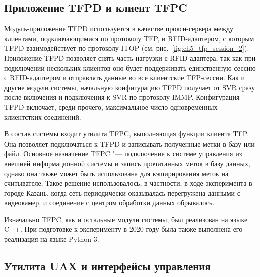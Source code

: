 \subsection{Приложение TFPD и клиент TFPC}\label{sec:ch5_components_tfpd_tfpc}

Модуль-приложение TFPD используется в качестве прокси-сервера между клиентами, подключающимися по протоколу TFP, и RFID-адаптером, с которым TFPD взаимодействует по протоколу ITOP (см. рис.~\ref{fig:ch5_tfp_session_2}). Приложение TFPD позволяет снять часть нагрузки с RFID-адаптера, так как при подключении нескольких клиентов оно будет поддерживать единственную сессию с RFID-адаптером и отправлять данные во все клиентские TFP-сессии. Как и другие модули системы, начальную конфигурацию TFPD получает от SVR сразу после включения и подключения к SVR по протоколу IMMP. Конфигурация TFPD включает, среди прочего, максимальное число одновременных клиентстких соединений.

В состав системы входит утилита TFPC, выполняющая функции клиента TFP. Она позволяет подключаться к TFPD и записывать полученные метки в базу или файл. Основное назначение TFPC "--- подключение к системе управления из внешней информационной системы и запись прочитанных меток в базу данных, однако она также может быть использована для кэширирования меток на считывателе. Такое решение использовалось, в частности, в ходе эксперимента в городе Казань, когда сеть периодически оказывалась перегружена данными с видеокамер, и соединение с центром обработки данных обрывалось.

Изначально TFPC, как и остальные модули системы, был реализован на языке C++. При подготовке к эксперименту в 2020 году была также выполнена его реализация на языке Python 3.


\subsection{Утилита UAX и интерфейсы управления}\label{sec:ch5_components_uax_and_cli}

